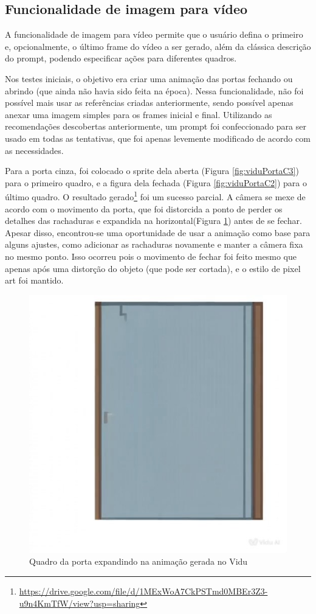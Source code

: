 \FloatBarrier
\subsection{Funcionalidade de imagem para vídeo}
\label{s.vidu.imagem}

A funcionalidade de imagem para vídeo permite que o usuário defina o primeiro e, opcionalmente, o último frame do vídeo a ser gerado, além da clássica descrição do prompt, podendo especificar ações para diferentes quadros. 

Nos testes iniciais, o objetivo era criar uma animação das portas fechando ou abrindo (que ainda não havia sido feita na época). Nessa funcionalidade, não foi possível mais usar as referências criadas anteriormente, sendo possível apenas anexar uma imagem simples para os frames inicial e final. Utilizando as recomendações descobertas anteriormente, um prompt foi confeccionado para ser usado em todas as tentativas, que foi apenas levemente modificado de acordo com as necessidades.

Para a porta cinza, foi colocado o sprite dela aberta (Figura \ref{fig:viduPortaC3}) para o primeiro quadro, e a figura dela fechada (Figura \ref{fig:viduPortaC2}) para o último quadro. O resultado gerado\footnote{\url{https://drive.google.com/file/d/1MExWoA7CkPSTmd0MBEr3Z3-u9n4KmTfW/view?usp=sharing}} foi um sucesso parcial. A câmera se mexe de acordo com o movimento da porta, que foi distorcida a ponto de perder os detalhes das rachaduras e expandida na horizontal(Figura \ref{fig:viduPortaMaior}) antes de se fechar. Apesar disso, encontrou-se uma oportunidade de usar a animação como base para alguns ajustes, como adicionar as rachaduras novamente e manter a câmera fixa no mesmo ponto. Isso ocorreu pois o movimento de fechar foi feito mesmo que apenas após uma distorção do objeto (que pode ser cortada), e o estilo de pixel art foi mantido. %

\begin{figure}[htbp]
    \centering
    \caption{\small Quadro da porta expandindo na animação gerada no Vidu}
    \label{fig:viduPortaMaior}
    \includegraphics[width=0.4\linewidth]{figs/vidu/framePortaHorizontalMaior.jpg}
\end{figure}

